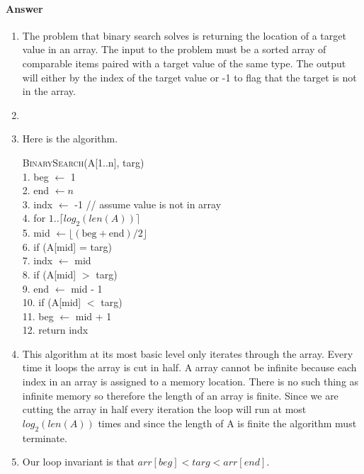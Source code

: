 \documentclass{article}
\begin{document}
\paragraph{Answer}


\begin{enumerate}
    \item The problem that binary search solves is returning the location of a target value in an array.
    The input to the problem must be a sorted array of comparable items paired with a target value of the same type.
    The output will either by the index of the target value or -1 to flag that the target is not in the array.
    \item
    \item Here is the algorithm.
    \begin{algorithm}
    	\textsc{BinarySearch}(A[1..n], targ) \\
    	1.  \hspace{0em}   beg $\leftarrow$ 1 \\
    	2.  \hspace{0em}   end $\leftarrow n$ \\
        3.  \hspace{0em}   indx $\leftarrow$ -1 // assume value is not in array \\
    	4.  \hspace{0em}   for $1.. \lceil log_2(len(A)) \rceil$ \\
    	5.  \hspace{2em}       mid $\leftarrow \lfloor (\text{beg}+\text{end})/2 \rfloor$ \\
    	6.  \hspace{2em}	   if (A[mid] = targ) \\
    	7.  \hspace{4em}	       indx $\leftarrow$ mid \\
    	8.  \hspace{2em}	   if (A[mid] $>$ targ) \\
    	9.  \hspace{4em}		   end $\leftarrow$ mid - 1 \\
    	10. \hspace{1.5em}	   if (A[mid] $<$ targ) \\
        11. \hspace{3.5em}        beg $\leftarrow$ mid + 1 \\
        12. return indx
    \end{algorithm}
    \item  This algorithm at its most basic level only iterates through the array. Every time it loops the array is cut in half. A array cannot be infinite because each index in an array is assigned to a memory location.  There is no such thing as infinite memory so therefore the length of an array is finite.  Since we are cutting the array in half every iteration the loop will run at most $log_2(len(A))$ times and since the length of A is finite the algorithm must terminate.
    \item Our loop invariant is that $arr[beg] < targ < arr[end]$.

\end{enumerate}
\end{document}
